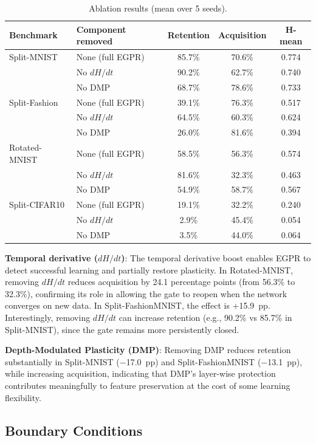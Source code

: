 \documentclass[11pt,a4paper]{article}
\begin{document}
\begin{table}[htbp]
\centering
\caption{Ablation results (mean over 5 seeds).}
\label{tab:ablation}
\begin{tabular}{llccc}
\toprule
Benchmark & Component removed & Retention & Acquisition & H-mean \\
\midrule
Split-MNIST & None (full EGPR) & 85.7\% & 70.6\% & 0.774 \\
 & No $dH/dt$ & 90.2\% & 62.7\% & 0.740 \\
 & No DMP & 68.7\% & 78.6\% & 0.733 \\
\midrule
Split-Fashion & None (full EGPR) & 39.1\% & 76.3\% & 0.517 \\
 & No $dH/dt$ & 64.5\% & 60.3\% & 0.624 \\
 & No DMP & 26.0\% & 81.6\% & 0.394 \\
\midrule
Rotated-MNIST & None (full EGPR) & 58.5\% & 56.3\% & 0.574 \\
 & No $dH/dt$ & 81.6\% & 32.3\% & 0.463 \\
 & No DMP & 54.9\% & 58.7\% & 0.567 \\
\midrule
Split-CIFAR10 & None (full EGPR) & 19.1\% & 32.2\% & 0.240 \\
 & No $dH/dt$ & 2.9\% & 45.4\% & 0.054 \\
 & No DMP & 3.5\% & 44.0\% & 0.064 \\
\bottomrule
\end{tabular}
\end{table}

\textbf{Temporal derivative ($dH/dt$)}: The temporal derivative boost enables EGPR to detect successful learning and partially restore plasticity. In Rotated-MNIST, removing $dH/dt$ reduces acquisition by 24.1 percentage points (from 56.3\% to 32.3\%), confirming its role in allowing the gate to reopen when the network converges on new data. In Split-FashionMNIST, the effect is +15.9~pp. Interestingly, removing $dH/dt$ can increase retention (e.g., 90.2\% vs 85.7\% in Split-MNIST), since the gate remains more persistently closed.

\textbf{Depth-Modulated Plasticity (DMP)}: Removing DMP reduces retention substantially in Split-MNIST ($-$17.0~pp) and Split-FashionMNIST ($-$13.1~pp), while increasing acquisition, indicating that DMP's layer-wise protection contributes meaningfully to feature preservation at the cost of some learning flexibility.

\subsection{Boundary Conditions}
\end{document}
